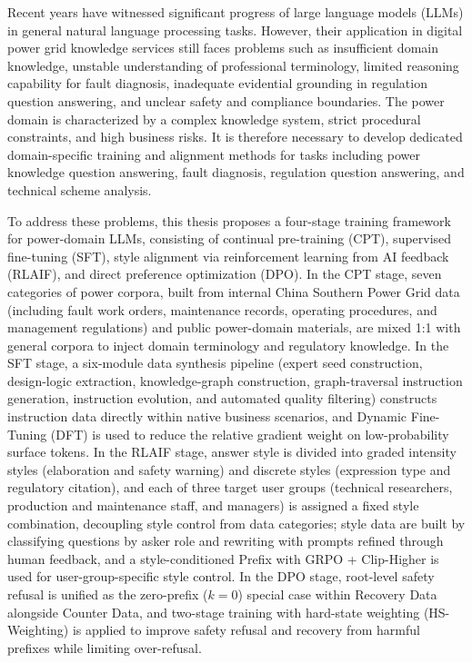 \documentclass[fontset=fandol,type=master,campus=shenzhen,etitleauto=true]{hithesisbook}
\begin{document}
\begin{eabstract}
Recent years have witnessed significant progress of large language models (LLMs) in general natural language processing tasks. However, their application in digital power grid knowledge services still faces problems such as insufficient domain knowledge, unstable understanding of professional terminology, limited reasoning capability for fault diagnosis, inadequate evidential grounding in regulation question answering, and unclear safety and compliance boundaries. The power domain is characterized by a complex knowledge system, strict procedural constraints, and high business risks. It is therefore necessary to develop dedicated domain-specific training and alignment methods for tasks including power knowledge question answering, fault diagnosis, regulation question answering, and technical scheme analysis.

To address these problems, this thesis proposes a four-stage training framework for power-domain LLMs, consisting of continual pre-training (CPT), supervised fine-tuning (SFT), style alignment via reinforcement learning from AI feedback (RLAIF), and direct preference optimization (DPO). In the CPT stage, seven categories of power corpora, built from internal China Southern Power Grid data (including fault work orders, maintenance records, operating procedures, and management regulations) and public power-domain materials, are mixed 1:1 with general corpora to inject domain terminology and regulatory knowledge. In the SFT stage, a six-module data synthesis pipeline (expert seed construction, design-logic extraction, knowledge-graph construction, graph-traversal instruction generation, instruction evolution, and automated quality filtering) constructs instruction data directly within native business scenarios, and Dynamic Fine-Tuning (DFT) is used to reduce the relative gradient weight on low-probability surface tokens. In the RLAIF stage, answer style is divided into graded intensity styles (elaboration and safety warning) and discrete styles (expression type and regulatory citation), and each of three target user groups (technical researchers, production and maintenance staff, and managers) is assigned a fixed style combination, decoupling style control from data categories; style data are built by classifying questions by asker role and rewriting with prompts refined through human feedback, and a style-conditioned Prefix with GRPO + Clip-Higher is used for user-group-specific style control. In the DPO stage, root-level safety refusal is unified as the zero-prefix ($k=0$) special case within Recovery Data alongside Counter Data, and two-stage training with hard-state weighting (HS-Weighting) is applied to improve safety refusal and recovery from harmful prefixes while limiting over-refusal.


\end{eabstract}
\end{document}
